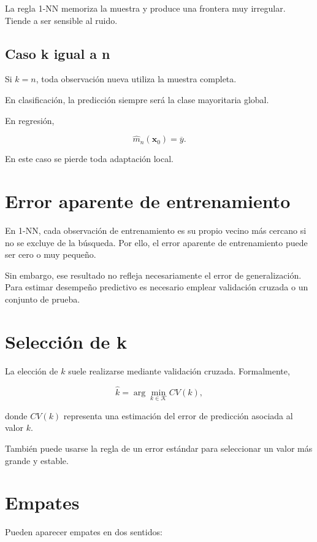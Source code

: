 \documentclass[
  spanish,
  11pt,
  letterpaper,
  DIV=11,
  numbers=noendperiod]{scrreprt}
\theoremstyle{definition}
\theoremstyle{plain}
\theoremstyle{definition}
\theoremstyle{remark}
\begin{document}
La regla 1-NN memoriza la muestra y produce una frontera muy irregular.
Tiende a ser sensible al ruido.

\subsection{Caso k igual a n}\label{caso-k-igual-a-n}

Si \(k=n\), toda observación nueva utiliza la muestra completa.

En clasificación, la predicción siempre será la clase mayoritaria
global.

En regresión,

\[
\widehat{m}_n(\mathbf{x}_0)=\overline{y}.
\]

En este caso se pierde toda adaptación local.

\section{Error aparente de
entrenamiento}\label{error-aparente-de-entrenamiento}

En 1-NN, cada observación de entrenamiento es su propio vecino más
cercano si no se excluye de la búsqueda. Por ello, el error aparente de
entrenamiento puede ser cero o muy pequeño.

Sin embargo, ese resultado no refleja necesariamente el error de
generalización. Para estimar desempeño predictivo es necesario emplear
validación cruzada o un conjunto de prueba.

\section{Selección de k}\label{selecciuxf3n-de-k}

La elección de \(k\) suele realizarse mediante validación cruzada.
Formalmente,

\[
\widehat{k}
=
\arg\min_{k\in\mathcal{K}} CV(k),
\]

donde \(CV(k)\) representa una estimación del error de predicción
asociada al valor \(k\).

También puede usarse la regla de un error estándar para seleccionar un
valor más grande y estable.

\section{Empates}\label{empates}

Pueden aparecer empates en dos sentidos:
\end{document}
